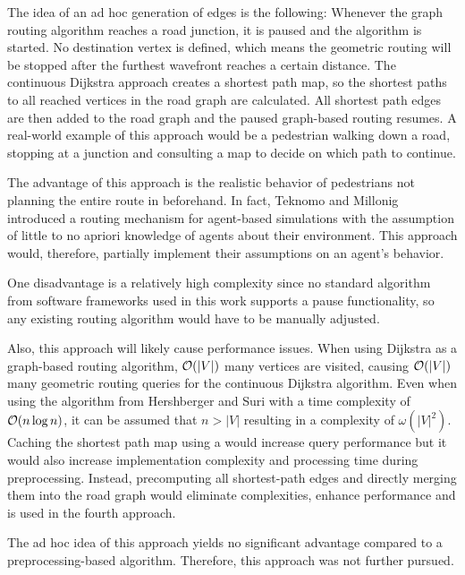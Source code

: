 		The idea of an ad hoc generation of edges is the following:
		Whenever the graph routing algorithm reaches a road junction, it is paused and the  algorithm is started.
		No destination vertex is defined, which means the geometric routing will be stopped after the furthest wavefront reaches a certain distance.
		The continuous Dijkstra approach creates a shortest path map, so the shortest paths to all reached vertices in the road graph are calculated.
		All shortest path edges are then added to the road graph and the paused graph-based routing resumes.
		A real-world example of this approach would be a pedestrian walking down a road, stopping at a junction and consulting a map to decide on which path to continue.
		
		The advantage of this approach is the realistic behavior of pedestrians not planning the entire route in beforehand.
		In fact, Teknomo and Millonig introduced a routing mechanism for agent-based simulations with the assumption of little to no apriori knowledge of agents about their environment\cite{teknomo-millonig-routing}.
		This approach would, therefore, partially implement their assumptions on an agent's behavior.
		
		One disadvantage is a relatively high complexity since no standard algorithm from software frameworks used in this work supports a pause functionality, so any existing routing algorithm would have to be manually adjusted.

		Also, this approach will likely cause performance issues.
		When using Dijkstra as a graph-based routing algorithm, $\mathcal{O}(|V|)$ many vertices are visited, causing $\mathcal{O}(|V|)$ many geometric routing queries for the continuous Dijkstra algorithm.
		Even when using the algorithm from Hershberger and Suri\cite{hershberger-suri} with a time complexity of $\mathcal{O}(n \log n)$, it can be assumed that $n > |V|$ resulting in a complexity of $\omega(|V|^2)$.
		Caching the shortest path map using a  would increase query performance but it would also increase implementation complexity and processing time during preprocessing.
		Instead, precomputing all shortest-path edges and directly merging them into the road graph would eliminate complexities, enhance performance and is used in the fourth approach.
		
		The ad hoc idea of this approach yields no significant advantage compared to a preprocessing-based algorithm.
		Therefore, this approach was not further pursued.
	
